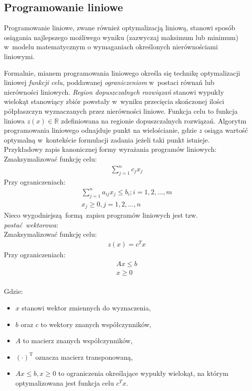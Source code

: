 \subsection{Programowanie liniowe}\label{ss_lp}
\par{
  Programowanie liniowe, zwane również optymalizacją liniową, stanowi sposób
  osiągania najlepszego możliwego wyniku (zazwyczaj maksimum lub minimum) w~modelu 
  matematycznym o wymaganiach określonych nierównościami liniowymi.
}
\par{
  Formalnie, mianem programowania liniowego określa się technikę optymalizacji 
  liniowej \emph{funkcji celu}, poddawanej \emph{ograniczeniom} w~postaci równań 
  lub nierówności liniowych.
  \emph{Region dopuszczalnych rozwiązań} stanowi wypukły wielokąt stanowiący 
  zbiór powstały w~wyniku przecięcia skończonej ilości półpłaszczyn wyznaczanych 
  przez nierówności liniowe.
  Funkcja celu to funkcja liniowa $z(x) \in \mathbb{R}$ zdefiniowana na regionie
  dopuszczalnych rozwiązań.
  Algorytm programowania liniowego odnajduje punkt na wielościanie,
  gdzie $z$ osiąga wartość optymalną w~kontekście formulacji zadania jeżeli taki
  punkt istnieje. 
  Przykładowy zapis kanonicznej formy wyrażania programów liniowych:\\
  Zmaksymalizować funkcję celu:
  \begin{align*}
    \sum_{j=1}^{n} c_j x_j
  \end{align*}
  Przy ograniczeniach: \begin{align*}
    \sum_{j=1}^{n}a_{ij}x_j \leq b_i; i =1, 2, \ldots, m\\
    x_j \geq 0, j=1, 2, \ldots, n
  \end{align*}
  Nieco wygodniejszą~formą zapisu programów liniowych jest tzw.
  \emph{postać~wektorowa}:\\
  Zmaksymalizować funkcję celu:
  \begin{align*}
    z(x)={c^T}x
  \end{align*}
  Przy ograniczeniach: \begin{align*}
    Ax \leq b\\
    x\geq 0
  \end{align*}\\
  Gdzie:
  \begin{itemize}
    \item $x$ stanowi wektor zmiennych do wyznaczenia,
    \item $b$ oraz $c$ to wektory znanych współczynników,
    \item $A$ to macierz znanych współczynników,
    \item ${(\cdot)}^\mathrm{T}$ oznacza macierz transponowaną,
    \item $Ax \leq b, x\geq 0$ to ograniczenia określające wypukły wielokąt,
      na którym optymalizowana jest funkcja celu $c^{T}x$.
  \end{itemize}
}
